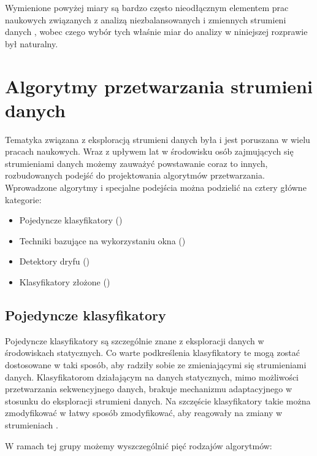 Wymienione powyżej miary są bardzo często nieodłącznym elementem prac naukowych związanych z analizą niezbalansowanych i zmiennych strumieni danych \cite{Article:TypyPrzykladow}\cite{Inbook:Metrics}\cite{Article:OBFirst}\cite{Article:OBSecond}, wobec czego wybór tych właśnie miar do analizy w niniejszej rozprawie był naturalny.

\section{Algorytmy przetwarzania strumieni danych}
\label{Teoria:Algorytmy}

\noindent Tematyka związana z eksploracją strumieni danych była i jest poruszana w wielu pracach naukowych. Wraz z upływem lat w środowisku osób zajmujących się strumieniami danych możemy zauważyć powstawanie coraz to innych, rozbudowanych podejść do projektowania algorytmów przetwarzania. Wprowadzone algorytmy i specjalne podejścia można podzielić na cztery główne kategorie:

\begin{itemize}
    \item Pojedyncze klasyfikatory ()
    \item Techniki bazujące na wykorzystaniu okna ()
    \item Detektory dryfu ()
    \item Klasyfikatory złożone ()
\end{itemize}

\subsection{Pojedyncze klasyfikatory}

\noindent Pojedyncze klasyfikatory są szczególnie znane z eksploracji danych w środowiskach statycznych. Co warte podkreślenia klasyfikatory te mogą zostać dostosowane w taki sposób, aby radziły sobie ze zmieniającymi się strumieniami danych. Klasyfikatorom działającym na danych statycznych, mimo możliwości przetwarzania sekwencyjnego danych, brakuje mechanizmu adaptacyjnego w stosunku do eksploracji strumieni danych. Na szczęście klasyfikatory takie można zmodyfikować w łatwy sposób zmodyfikować, aby reagowały na zmiany w strumieniach \cite{BrzezPhd2015}. 

W ramach tej grupy możemy wyszczególnić pięć rodzajów algorytmów:

